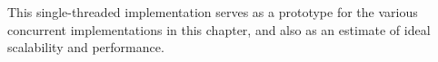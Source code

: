 This single-threaded implementation serves as a prototype for the various
concurrent implementations in this chapter, and also as an estimate of
ideal scalability and performance.
\fi








